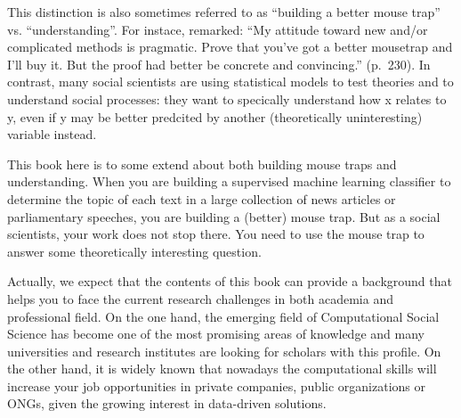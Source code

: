 This distinction is also sometimes referred to as ``building a better
mouse trap'' vs. ``understanding''. For instace, \cite{Breiman2001}
remarked: ``My attitude toward new and/or complicated methods is
pragmatic. Prove that you've got a better mousetrap and I'll buy
it. But the proof had better be concrete and convincing.''
(p.~230).
In contrast, many social scientists are using statistical
models to test theories and to understand social processes: they want
to specically understand how x relates to y, even if y may be better
predcited by another (theoretically uninteresting) variable instead.

This book here is to some extend about both building mouse traps and understanding. When you
are building a supervised machine learning classifier to determine the
topic of each text in a large collection of news articles or
parliamentary speeches, you are building a (better) mouse trap. But as
a social scientists, your work does not stop there. You need to use
the mouse trap to answer some theoretically interesting question.

Actually, we expect that the contents of this book can provide a background that helps you to face the current research challenges in both academia and professional field. On the one hand, the emerging field of Computational Social Science has become one of the most promising areas of knowledge and many universities and research institutes are looking for scholars with this profile.  On the other hand, it is widely known that nowadays the computational skills will increase your job opportunities in private companies, public organizations or ONGs, given the growing interest in data-driven solutions.

